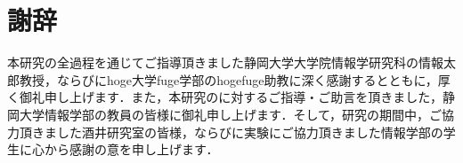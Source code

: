\chapter*{謝辞}

本研究の全過程を通じてご指導頂きました静岡大学大学院情報学研究科の情報太郎教授，ならびにhoge大学fuge学部のhogefuge助教に深く感謝するとともに，厚く御礼申し上げます．また，本研究のに対するご指導・ご助言を頂きました，静岡大学情報学部の教員の皆様に御礼申し上げます．そして，研究の期間中，ご協力頂きました酒井研究室の皆様，ならびに実験にご協力頂きました情報学部の学生に心から感謝の意を申し上げます．